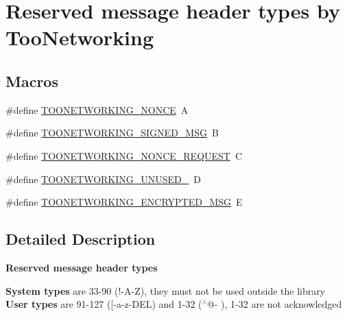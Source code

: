 \hypertarget{group__RESERVED__TYPES}{}\section{Reserved message header types by Too\+Networking}
\label{group__RESERVED__TYPES}
\subsection*{Macros}
\begin{DoxyCompactItemize}
\item 
\#define \hyperlink{group__RESERVED__TYPES_ga4f8f008bc94d8780af5082af5ac0bd22}{T\+O\+O\+N\+E\+T\+W\+O\+R\+K\+I\+N\+G\+\_\+\+N\+O\+N\+CE}~\textquotesingle{}A\textquotesingle{}
\item 
\#define \hyperlink{group__RESERVED__TYPES_ga156314082f4b84ae59aef0fc86508323}{T\+O\+O\+N\+E\+T\+W\+O\+R\+K\+I\+N\+G\+\_\+\+S\+I\+G\+N\+E\+D\+\_\+\+M\+SG}~\textquotesingle{}B\textquotesingle{}
\item 
\#define \hyperlink{group__RESERVED__TYPES_gaaa10b54b7ba518caefbd61fa6914cb2b}{T\+O\+O\+N\+E\+T\+W\+O\+R\+K\+I\+N\+G\+\_\+\+N\+O\+N\+C\+E\+\_\+\+R\+E\+Q\+U\+E\+ST}~\textquotesingle{}C\textquotesingle{}
\item 
\#define \hyperlink{group__RESERVED__TYPES_ga209a4ce63d81c941f7eae10f490091ab}{T\+O\+O\+N\+E\+T\+W\+O\+R\+K\+I\+N\+G\+\_\+\+U\+N\+U\+S\+E\+D\+\_}~\textquotesingle{}D\textquotesingle{}
\item 
\#define \hyperlink{group__RESERVED__TYPES_ga0957fc284700186f98b69dca21389f26}{T\+O\+O\+N\+E\+T\+W\+O\+R\+K\+I\+N\+G\+\_\+\+E\+N\+C\+R\+Y\+P\+T\+E\+D\+\_\+\+M\+SG}~\textquotesingle{}E\textquotesingle{}
\end{DoxyCompactItemize}


\subsection{Detailed Description}
{\bfseries Reserved message header types}

{\bfseries System types} are 33-\/90 (\textquotesingle{}!\textquotesingle{}-\/A\textquotesingle{}-\/\textquotesingle{}Z\textquotesingle{}), they must not be used outside the library~\newline
 {\bfseries User types} are 91-\/127 (\textquotesingle{}\mbox{[}\textquotesingle{}-\/\textquotesingle{}a\textquotesingle{}-\/\textquotesingle{}z\textquotesingle{}-\/\textquotesingle{}D\+EL\textquotesingle{}) and 1-\/32 (\textquotesingle{}$^\wedge$@\textquotesingle{}-\/\textquotesingle{} \textquotesingle{}), 1-\/32 are not acknowledged~\newline
 

